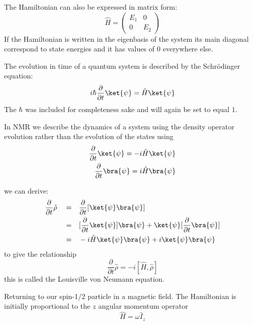 The Hamiltonian can also be expressed in matrix form:
\begin{equation}
  \hat{H} = \begin{pmatrix}
    E_1 & 0\\
    0 & E_2
\end{pmatrix}
\end{equation}
If the Hamiltonian is written in the eigenbasis of the system its main diagonal correspond to state energies and it has values of $0$ everywhere else.

The evolution in time of a quantum system is described by the Schr\"odinger equation:
\begin{equation}
  i\hbar\frac{\partial}{\partial{t}}\ket{\psi} = \hat{H}\ket{\psi}
\end{equation}
The $\hbar$ was included for completeness sake and will again be set to equal $1$.

In NMR we describe the dynamics of a system using the density operator evolution rather than the evolution of the states using
\begin{equation}
\begin{align}
  \frac{\partial}{\partial{t}}\ket{\psi} = -i\hat{H}\ket{\psi}\\
  \frac{\partial}{\partial{t}}\bra{\psi} = i\hat{H}\bra{\psi}
\end{align}
\end{equation}

we can derive\citep{Neumann2018}:
\begin{equation}
\begin{align}
  \frac{\partial}{\partial{t}}\hat\rho\quad=&\quad \frac{\partial}{\partial{t}}[\ket{\psi}\bra{\psi}]\\
  =&\quad[\frac{\partial}{\partial{t}}\ket{\psi}]\bra{\psi} + \ket{\psi}[\frac{\partial}{\partial{t}}\bra{\psi}]\\
  =&\quad-i\hat{H}\ket{\psi}\bra{\psi} + i\ket{\psi}\bra{\psi}
\end{align}
\end{equation}
to give the relationship
\begin{equation}
  \frac{\partial}{\partial{t}}\hat\rho = -i[\hat{H},\hat\rho]
\end{equation}
this is called the Louisville von Neumann equation.

Returning to our spin-1/2 particle in a magnetic field. The Hamiltonian is initially
proportional to the $z$ angular momentum operator
\begin{equation}
  \hat{H} = \omega\hat{I}_z
\end{equation}

